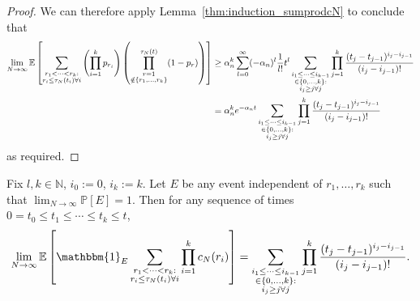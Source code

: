 \documentclass{article}
\newcommand{\Prob}{\mathbb{P}}
\newcommand{\E}{\mathbb{E}}
\newcommand{\1}[1]{\mathbbm{1}_{#1}}
\begin{document}
\begin{proof}
We can therefore apply Lemma~\ref{thm:induction_sumprodcN} to conclude that
\begin{align}
\lim_{N\to\infty} \E \left[ 
        \sum_{\substack{r_1 <\dots< r_k :\\ r_i \leq \tau_N(t_i) \forall i}}
        \left( \prod_{i=1}^k p_{r_i} \right)
        \left( \prod_{\substack{r=1 \\ \notin \{r_1,\dots,r_k\} }}^{\tau_N(t)} 
        (1-p_r) \right) \right]
&\geq \alpha_n^k
        \sum_{l=0}^{\infty} (-\alpha_n)^l
        \frac{1}{l!} t^l
        \sum_{\substack{i_1\leq \dots\leq i_{k-1}\\ \in \{0,\dots,k\} :
        \\ i_j \geq j \forall j}} 
        \prod_{j=1}^k \frac{(t_j - t_{j-1})^{i_j - i_{j-1}}}{(i_j - i_{j-1})! } \notag\\
&= \alpha_n^k e^{-\alpha_n t} 
        \sum_{\substack{i_1\leq \dots\leq i_{k-1}\\ \in \{0,\dots,k\} :
        \\ i_j \geq j \forall j}} 
        \prod_{j=1}^k \frac{(t_j - t_{j-1})^{i_j - i_{j-1}}}{(i_j - i_{j-1})! }
\end{align}
as required.
\end{proof}


\begin{lemma}\label{thm:induction_sumprodcN}
Fix $l, k \in \mathbb{N}$, $i_0:=0$, $i_k:=k$. 
Let $E$ be any event independent of $r_1,\dots,r_k$ such that 
$\lim_{N\to\infty} \Prob[E] =1$. 
Then for any sequence of times 
$0 = t_0 \leq t_1 \leq \cdots \leq t_k \leq t$,
\begin{equation}\label{eq:032}
\lim_{N\to\infty} \E \left[ \1{E} 
        \sum_{\substack{r_1<\dots<r_k :\\ r_i\leq \tau_N(t_i) \forall i}}
        \prod_{i=1}^k c_N(r_i) \right] 
= \sum_{\substack{i_1\leq \dots\leq i_{k-1}\\ \in \{0,\dots,k\} :
        \\ i_j \geq j \forall j}} 
        \prod_{j=1}^k \frac{(t_j - t_{j-1})^{i_j - i_{j-1}}}{(i_j - i_{j-1})! } .
\end{equation}
\end{lemma}
\end{document}
